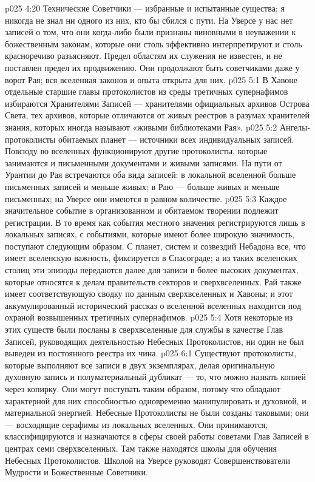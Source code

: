 \vs p025 4:20 Технические Советчики --- избранные и испытанные существа; я никогда не знал ни одного из них, кто бы сбился с пути. На Уверсе у нас нет записей о том, что они когда\hyp{}либо были признаны виновными в неуважении к божественным законам, которые они столь эффективно интерпретируют и столь красноречиво разъясняют. Предел областям их служения не известен, и не поставлен предел их продвижению. Они продолжают быть советчиками даже у ворот Рая; вся вселенная законов и опыта открыта для них.
\vs p025 5:1 В Хавоне отдельные старшие главы протоколистов из среды третичных супернафимов избираются Хранителями Записей --- хранителями официальных архивов Острова Света, тех архивов, которые отличаются от живых реестров в разумах хранителей знания, которых иногда называют «живыми библиотеками Рая».
\vs p025 5:2 Ангелы\hyp{}протоколисты обитаемых планет --- источники всех индивидуальных записей. Повсюду во вселенных функционируют другие протоколисты, которые занимаются и письменными документами и живыми записями. На пути от Урантии до Рая встречаются оба вида записей: в локальной вселенной больше письменных записей и меньше живых; в Раю --- больше живых и меньше письменных; на Уверсе они имеются в равном количестве.
\vs p025 5:3 Каждое значительное событие в организованном и обитаемом творении подлежит регистрации. В то время как события местного значения регистрируются лишь в локальных записях, с событиями, которые имеют более широкую значимость, поступают следующим образом. С планет, систем и созвездий Небадона все, что имеет вселенскую важность, фиксируется в Спасограде; а из таких вселенских столиц эти эпизоды передаются далее для записи в более высоких документах, которые относятся к делам правительств секторов и сверхвселенных. Рай также имеет соответствующую сводку по данным сверхвселенных и Хавоны; и этот аккумулированный исторический рассказ о вселенной вселенных находится под охраной возвышенных третичных супернафимов.
\vs p025 5:4 Хотя некоторые из этих существ были посланы в сверхвселенные для службы в качестве Глав Записей, руководящих деятельностью Небесных Протоколистов, ни один не был выведен из постоянного реестра их чина.
\vs p025 6:1 Существуют протоколисты, которые выполняют все записи в двух экземплярах, делая оригинальную духовную запись и полуматериальный дубликат --- то, что можно назвать копией через копирку. Они могут поступать таким образом, потому что обладают характерной для них способностью одновременно манипулировать и духовной, и материальной энергией. Небесные Протоколисты не были созданы таковыми; они --- восходящие серафимы из локальных вселенных. Они принимаются, классифицируются и назначаются в сферы своей работы советами Глав Записей в центрах семи сверхвселенных. Там также находятся школы для обучения Небесных Протоколистов. Школой на Уверсе руководят Совершенствователи Мудрости и Божественные Советники.
